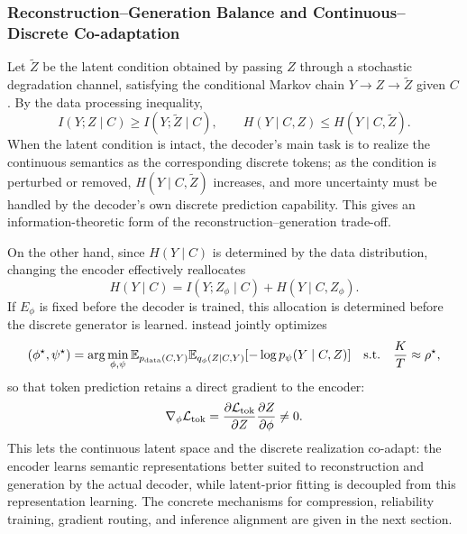 \subsubsection{Reconstruction--Generation Balance and Continuous--Discrete Co-adaptation}

Let $\widetilde Z$ be the latent condition obtained by passing $Z$ through a stochastic degradation channel, satisfying the conditional Markov chain $Y\rightarrow Z\rightarrow\widetilde Z$ given $C$. By the data processing inequality,
\begin{equation}
    I(Y;Z\mid C)
    \ge I(Y;\widetilde Z\mid C),
    \qquad
    H(Y\mid C,Z)
    \le H(Y\mid C,\widetilde Z).
    \label{eq:main-recon-gen-dpi}
\end{equation}
When the latent condition is intact, the decoder's main task is to realize the continuous semantics as the corresponding discrete tokens; as the condition is perturbed or removed, $H(Y\mid C,\widetilde Z)$ increases, and more uncertainty must be handled by the decoder's own discrete prediction capability. This gives an information-theoretic form of the reconstruction--generation trade-off.

On the other hand, since $H(Y\mid C)$ is determined by the data distribution, changing the encoder effectively reallocates
\begin{equation}
    H(Y\mid C)
    =I(Y;Z_\phi\mid C)+H(Y\mid C,Z_\phi).
    \label{eq:main-coadapt-info}
\end{equation}
If $E_\phi$ is fixed before the decoder is trained, this allocation is determined before the discrete generator is learned. \method instead jointly optimizes
\begin{equation}
    (\phi^\star,\psi^\star)
    =\arg\min_{\phi,\psi}
    \mathbb{E}_{p_{\mathrm{data}}(C,Y)}
    \mathbb{E}_{q_\phi(Z\mid C,Y)}
    [-\log p_\psi(Y\mid C,Z)]
    \quad
    \text{s.t.}\quad \frac{K}{T}\approx\rho^\star,
    \label{eq:main-coadapt-opt}
\end{equation}
so that token prediction retains a direct gradient to the encoder:
\begin{equation}
    \nabla_\phi\mathcal{L}_{\mathrm{tok}}
    =
    \frac{\partial\mathcal{L}_{\mathrm{tok}}}{\partial Z}
    \frac{\partial Z}{\partial\phi}
    \neq0.
    \label{eq:main-coadapt-grad}
\end{equation}
This lets the continuous latent space and the discrete realization co-adapt: the encoder learns semantic representations better suited to reconstruction and generation by the actual decoder, while latent-prior fitting is decoupled from this representation learning. The concrete mechanisms for compression, reliability training, gradient routing, and inference alignment are given in the next section.

